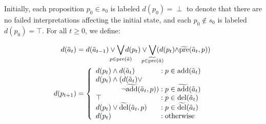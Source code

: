 \documentclass{article}
\newtheorem{theorem}{Theorem}[section]
\begin{document}
Initially, each proposition $p_0 \in s_0$ is labeled $d(p_0) = \perp$ to denote that there are no failed interpretations affecting the initial state, and each $p_0 \not\in s_0$ is labeled $d(p_0)=\top$.  For all $t \geq 0$, we define: 

 \begin{align}
\label{eqn:actlabel}d(\tilde{a}_t) &=  
d(\tilde{a}_{t-1}) \vee \hspace*{-.35cm}\bigvee\limits_{p \in \text{pre}(\tilde{a})}\hspace*{-.39cm} d(p_t) \vee\hspace*{-.35cm} \bigvee\limits_{p \in \widetilde{\text{pre}}(\tilde{a})} \hspace*{-.35cm}(d(p_t)\hspace*{-.09cm}\wedge\hspace*{-.09cm} \widetilde{\text{pre}}(\tilde{a}_t, p)  ) %
\\
\label{eqn:proplabel}\hspace*{-.1cm}d(p_{t+1}) &= \left\{
\begin{array}{l@{\;}l@{\;}r}
d(p_t) \wedge d(\tilde{a}_t) & : p \in \text{add}(\tilde{a}_t) \\
d(p_t) \wedge  (d(\tilde{a}_t) \vee \\
\hspace*{1.25cm} \neg\widetilde{\text{add}}(\tilde{a}_t, p)) & : p \in \widetilde{\text{add}}(\tilde{a}_t)\\
\top & : p \in \text{del}(\tilde{a}_t)\\
d(p_t) \vee  \widetilde{\text{del}}(\tilde{a}_t, p) %
 &: p \in \widetilde{\text{del}}(\tilde{a}_t)\\
d(p_t) & : \text{otherwise} 
\end{array}
\right. 
\end{align}

%

\end{document}
